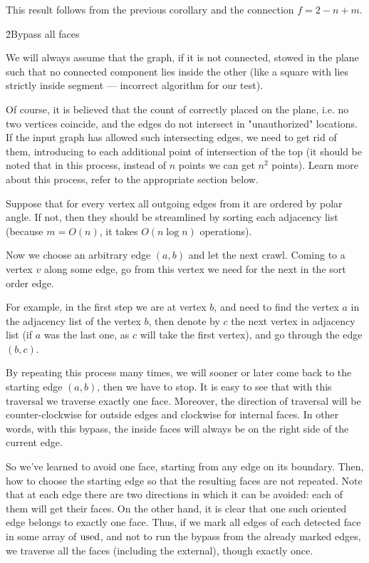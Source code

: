 This result follows from the previous corollary and the connection $f = 2 - n + m$.


\h2{Bypass all faces}

We will always assume that the graph, if it is not connected, stowed in the plane such that no connected component lies inside the other (like a square with lies strictly inside segment --- incorrect algorithm for our test).

Of course, it is believed that the count of correctly placed on the plane, i.e. no two vertices coincide, and the edges do not intersect in "unauthorized" locations. If the input graph has allowed such intersecting edges, we need to get rid of them, introducing to each additional point of intersection of the top (it should be noted that in this process, instead of $n$ points we can get $n^2$ points). Learn more about this process, refer to the appropriate section below.

Suppose that for every vertex all outgoing edges from it are ordered by polar angle. If not, then they should be streamlined by sorting each adjacency list (because $m = O(n)$, it takes $O (n \log n)$ operations).

Now we choose an arbitrary edge $(a,b)$ and let the next crawl. Coming to a vertex $v$ along some edge, go from this vertex we need for the next in the sort order edge.

For example, in the first step we are at vertex $b$, and need to find the vertex $a$ in the adjacency list of the vertex $b$, then denote by $c$ the next vertex in adjacency list (if $a$ was the last one, as $c$ will take the first vertex), and go through the edge $(b,c)$.

By repeating this process many times, we will sooner or later come back to the starting edge $(a,b)$, then we have to stop. It is easy to see that with this traversal we traverse exactly one face. Moreover, the direction of traversal will be counter-clockwise for outside edges and clockwise for internal faces. In other words, with this bypass, the inside faces will always be on the right side of the current edge.

So we've learned to avoid one face, starting from any edge on its boundary. Then, how to choose the starting edge so that the resulting faces are not repeated. Note that at each edge there are two directions in which it can be avoided: each of them will get their faces. On the other hand, it is clear that one such oriented edge belongs to exactly one face. Thus, if we mark all edges of each detected face in some array of $\rm used$, and not to run the bypass from the already marked edges, we traverse all the faces (including the external), though exactly once.

